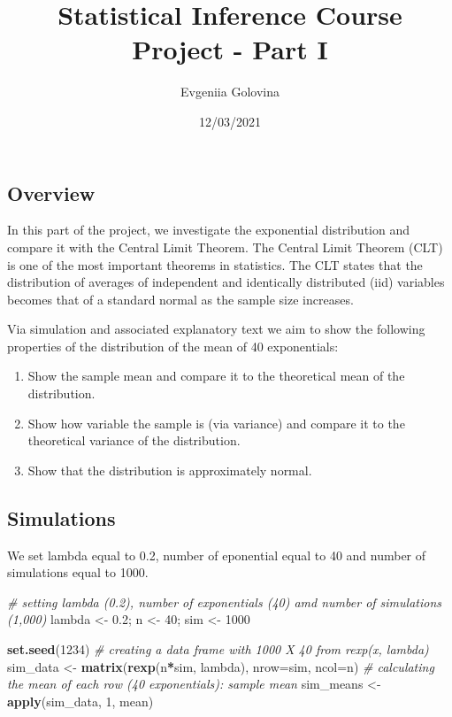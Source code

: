 \documentclass[]{article}
\title{Statistical Inference Course Project - Part I}
\author{Evgeniia Golovina}
\date{12/03/2021}
\newenvironment{Shaded}{\begin{snugshade}}{\end{snugshade}}
\newcommand{\CommentTok}[1]{\textcolor[rgb]{0.56,0.35,0.01}{\textit{#1}}}
\newcommand{\DataTypeTok}[1]{\textcolor[rgb]{0.13,0.29,0.53}{#1}}
\newcommand{\DecValTok}[1]{\textcolor[rgb]{0.00,0.00,0.81}{#1}}
\newcommand{\FloatTok}[1]{\textcolor[rgb]{0.00,0.00,0.81}{#1}}
\newcommand{\KeywordTok}[1]{\textcolor[rgb]{0.13,0.29,0.53}{\textbf{#1}}}
\newcommand{\NormalTok}[1]{#1}
\newcommand{\OperatorTok}[1]{\textcolor[rgb]{0.81,0.36,0.00}{\textbf{#1}}}
\newcommand{\StringTok}[1]{\textcolor[rgb]{0.31,0.60,0.02}{#1}}
\providecommand{\tightlist}{%
  \setlength{\itemsep}{0pt}\setlength{\parskip}{0pt}}
\begin{document}
\maketitle

\hypertarget{overview}{%
\subsection{Overview}\label{overview}}

In this part of the project, we investigate the exponential distribution
and compare it with the Central Limit Theorem. The Central Limit Theorem
(CLT) is one of the most important theorems in statistics. The CLT
states that the distribution of averages of independent and identically
distributed (iid) variables becomes that of a standard normal as the
sample size increases.

Via simulation and associated explanatory text we aim to show the
following properties of the distribution of the mean of 40 exponentials:

\begin{enumerate}
\def\labelenumi{\arabic{enumi}.}
\tightlist
\item
  Show the sample mean and compare it to the theoretical mean of the
  distribution.
\item
  Show how variable the sample is (via variance) and compare it to the
  theoretical variance of the distribution.
\item
  Show that the distribution is approximately normal.
\end{enumerate}

\hypertarget{simulations}{%
\subsection{Simulations}\label{simulations}}

We set lambda equal to 0.2, number of eponential equal to 40 and number
of simulations equal to 1000.

\begin{Shaded}
\begin{Highlighting}[]
\CommentTok{# setting lambda (0.2), number of exponentials (40) amd number of simulations (1,000)}
\NormalTok{lambda <-}\StringTok{ }\FloatTok{0.2}\NormalTok{; n <-}\StringTok{ }\DecValTok{40}\NormalTok{; sim <-}\StringTok{ }\DecValTok{1000}

\KeywordTok{set.seed}\NormalTok{(}\DecValTok{1234}\NormalTok{)}
\CommentTok{# creating a data frame with 1000 X 40 from rexp(x, lambda) }
\NormalTok{sim_data <-}\StringTok{ }\KeywordTok{matrix}\NormalTok{(}\KeywordTok{rexp}\NormalTok{(n}\OperatorTok{*}\NormalTok{sim, lambda), }\DataTypeTok{nrow=}\NormalTok{sim, }\DataTypeTok{ncol=}\NormalTok{n)}
\CommentTok{# calculating the mean of each row (40 exponentials): sample mean}
\NormalTok{sim_means <-}\StringTok{ }\KeywordTok{apply}\NormalTok{(sim_data, }\DecValTok{1}\NormalTok{, mean)}
\end{Highlighting}
\end{Shaded}
\end{document}
